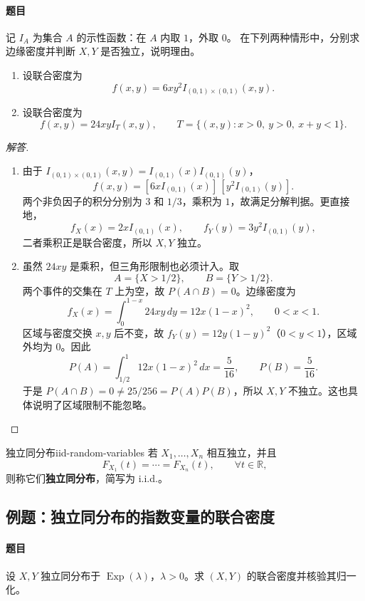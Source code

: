 \paragraph{题目}
记 $I_A$ 为集合 $A$ 的示性函数：在 $A$ 内取 $1$，外取 $0$。
在下列两种情形中，分别求边缘密度并判断 $X,Y$ 是否独立，说明理由。
\begin{enumerate}
\item 设联合密度为
\[
f(x,y)=6xy^2 I_{(0,1)\times(0,1)}(x,y).
\]

\item 设联合密度为
\[
f(x,y)=24xyI_T(x,y),\qquad
T=\{(x,y):x>0,\ y>0,\ x+y<1\}.
\]
\end{enumerate}

\begin{proof}[解答]
\begin{enumerate}
\item 由于 $I_{(0,1)\times(0,1)}(x,y)=I_{(0,1)}(x)I_{(0,1)}(y)$，
\[
f(x,y)=[6xI_{(0,1)}(x)]\,[y^2I_{(0,1)}(y)].
\]
两个非负因子的积分分别为 $3$ 和 $1/3$，乘积为 $1$，故满足分解判据。更直接地，
\[
f_X(x)=2xI_{(0,1)}(x),\qquad
f_Y(y)=3y^2I_{(0,1)}(y),
\]
二者乘积正是联合密度，所以 $X,Y$ 独立。

\item 虽然 $24xy$ 是乘积，但三角形限制也必须计入。取
\[
A=\{X>1/2\},\qquad B=\{Y>1/2\}.
\]
两个事件的交集在 $T$ 上为空，故 $P(A\cap B)=0$。边缘密度为
\[
f_X(x)=\int_0^{1-x}24xy\,dy=12x(1-x)^2,\qquad 0<x<1.
\]
区域与密度交换 $x,y$ 后不变，故 $f_Y(y)=12y(1-y)^2$（$0<y<1$），区域外均为 $0$。因此
\[
P(A)=\int_{1/2}^1 12x(1-x)^2\,dx=\frac5{16},
\qquad P(B)=\frac5{16}.
\]
于是 $P(A\cap B)=0\ne25/256=P(A)P(B)$，所以 $X,Y$ 不独立。这也具体说明了区域限制不能忽略。
\end{enumerate}
\end{proof}

\begin{mydefinition}{独立同分布}{iid-random-variables}
若 $X_1,\ldots,X_n$ 相互独立，并且
\[
F_{X_1}(t)=\cdots=F_{X_n}(t),\qquad \forall t\in\mathbb R,
\]
则称它们\textbf{独立同分布}，简写为 i.i.d.。
\end{mydefinition}

\subsection{例题：独立同分布的指数变量的联合密度}\label{note:c3:e9}
\paragraph{题目}
设 $X,Y$ 独立同分布于 $\operatorname{Exp}(\lambda)$，$\lambda>0$。求 $(X,Y)$ 的联合密度并核验其归一化。

